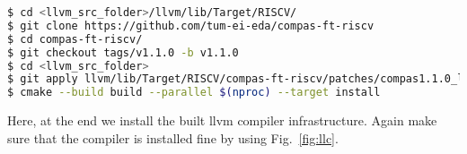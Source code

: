 \begin{framed}
 \begin{lstlisting}[language=bash, basicstyle=\small\ttfamily]
$ cd <llvm_src_folder>/llvm/lib/Target/RISCV/
$ git clone https://github.com/tum-ei-eda/compas-ft-riscv
$ cd compas-ft-riscv/
$ git checkout tags/v1.1.0 -b v1.1.0
$ cd <llvm_src_folder>
$ git apply llvm/lib/Target/RISCV/compas-ft-riscv/patches/compas1.1.0_llvm13.0.1_src.patch
$ cmake --build build --parallel $(nproc) --target install
\end{lstlisting}
\end{framed}

Here, at the end we install the built llvm compiler infrastructure. Again make sure that the compiler is installed fine
by using Fig.~\ref{fig:llc}.
